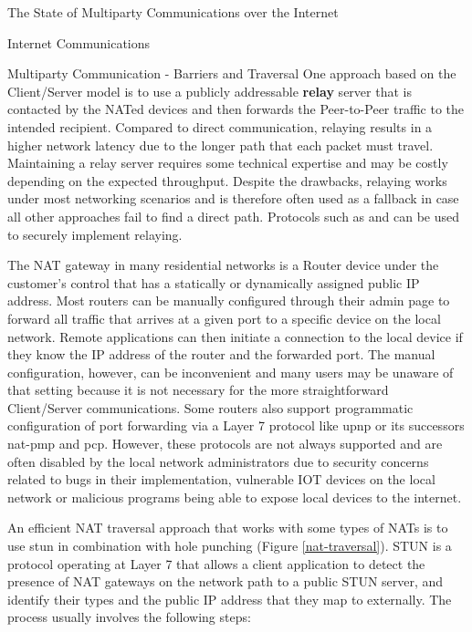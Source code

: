 \begin{frame}[fragile]{The State of Multiparty Communications over the
Internet}
\begin{block}{Internet Communications}
\begin{block}{Multiparty Communication - Barriers and Traversal}
One approach based on the Client/Server model is to use a publicly
addressable \textbf{relay} server that is contacted by the NATed devices
and then forwards the Peer-to-Peer traffic to the intended recipient.
Compared to direct communication, relaying results in a higher network
latency due to the longer path that each packet must travel. Maintaining
a relay server requires some technical expertise and may be costly
depending on the expected throughput. Despite the drawbacks, relaying
works under most networking scenarios and is therefore often used as a
fallback in case all other approaches fail to find a direct path.
Protocols such as  \autocite{turnRFC} and 
\autocite{derpDocs} can be used to securely implement relaying.

The NAT gateway in many residential networks is a Router device under
the customer's control that has a statically or dynamically assigned
public IP address. Most routers can be manually configured through their
admin page to forward all traffic that arrives at a given port to a
specific device on the local network. Remote applications can then
initiate a connection to the local device if they know the IP address of
the router and the forwarded port. The manual configuration, however,
can be inconvenient and many users may be unaware of that setting
because it is not necessary for the more straightforward Client/Server
communications. Some routers also support programmatic configuration of
port forwarding via a Layer 7 protocol like \gls{upnp} or its successors
\gls{nat-pmp} and \gls{pcp}. However, these protocols are not always
supported and are often disabled by the local network administrators due
to security concerns related to bugs in their implementation, vulnerable
IOT devices on the local network or malicious programs being able to
expose local devices to the internet.


An efficient NAT traversal approach that works with some types of NATs
is to use \gls{stun} \autocite{stunRFC} in combination with 
hole punching (Figure \ref{nat-traversal}). STUN is a protocol operating
at Layer 7 that allows a client application to detect the presence of
NAT gateways on the network path to a public STUN server, and identify
their types and the public IP address that they map to externally. The
process usually involves the following steps:


\end{block}
\end{block}
\end{frame}

